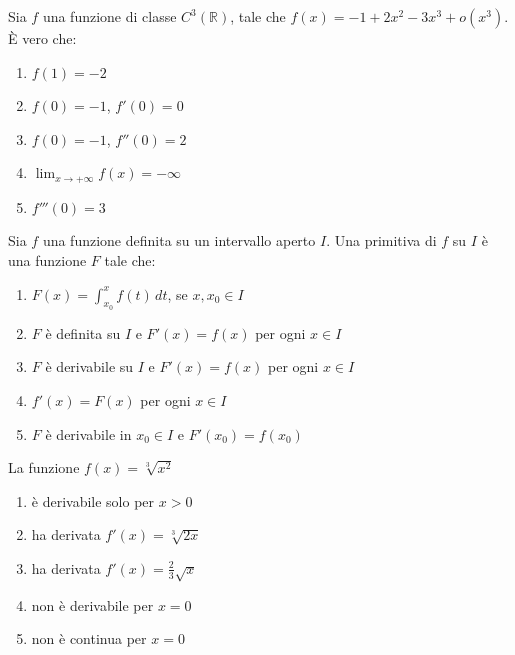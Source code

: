 \begin{quiz}
Sia $f$ una funzione di classe $C^3(\mathbb R)$, tale che $f(x)=-1+2x^2-3x^3+o(x^3)$. È vero che:
\begin{enumerate}[label=\alph*),leftmargin=1.3cm,itemsep=3pt,topsep=5pt]\item $f(1)=-2$\item $f(0)=-1$, $f'(0)=0$\item $f(0)=-1$, $f''(0)=2$\item $\lim_{x\to+\infty}f(x)=-\infty$\item $f'''(0)=3$\end{enumerate}
\end{quiz}

\begin{quiz}
Sia $f$ una funzione definita su un intervallo aperto $I$. Una primitiva di $f$ su $I$ \`e una funzione $F$ tale che:
\begin{enumerate}[label=\alph*),leftmargin=1.3cm,itemsep=3pt,topsep=5pt]\item $F(x)=\int_{x_0}^x f(t)\,dt$, se $x,x_0\in I$\item $F$ \`e definita su $I$ e $F'(x)=f(x)$ per ogni $x\in I$\item $F$ \`e derivabile su $I$ e $F'(x)=f(x)$ per ogni $x\in I$\item $f'(x)=F(x)$ per ogni $x\in I$\item $F$ \`e derivabile in $x_0\in I$ e $F'(x_0)=f(x_0)$\end{enumerate}
\end{quiz}

\begin{quiz}
La funzione $f(x)=\sqrt[3]{x^2}$
\begin{enumerate}[label=\alph*),leftmargin=1.3cm,itemsep=3pt,topsep=5pt]\item \`e derivabile solo per $x>0$\item ha derivata $f'(x)=\sqrt[3]{2x}$\item ha derivata $f'(x)=\frac23\sqrt{x}$\item non \`e derivabile per $x=0$\item non \`e continua per $x=0$\end{enumerate}
\end{quiz}

